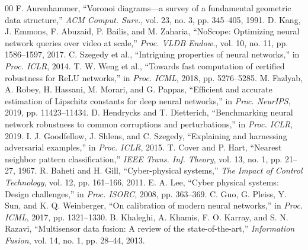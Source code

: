 \documentclass[conference]{IEEEtran}
\begin{document}
\begin{thebibliography}{00}
 F. Aurenhammer, ``Voronoi diagrams---a survey of a fundamental geometric data structure,'' \emph{ACM Comput. Surv.}, vol. 23, no. 3, pp. 345--405, 1991.
 D. Kang, J. Emmons, F. Abuzaid, P. Bailis, and M. Zaharia, ``NoScope: Optimizing neural network queries over video at scale,'' \emph{Proc. VLDB Endow.}, vol. 10, no. 11, pp. 1586--1597, 2017.
 C. Szegedy et al., ``Intriguing properties of neural networks,'' in \emph{Proc. ICLR}, 2014.
 T. W. Weng et al., ``Towards fast computation of certified robustness for ReLU networks,'' in \emph{Proc. ICML}, 2018, pp. 5276--5285.
 M. Fazlyab, A. Robey, H. Hassani, M. Morari, and G. Pappas, ``Efficient and accurate estimation of Lipschitz constants for deep neural networks,'' in \emph{Proc. NeurIPS}, 2019, pp. 11423--11434.
 D. Hendrycks and T. Dietterich, ``Benchmarking neural network robustness to common corruptions and perturbations,'' in \emph{Proc. ICLR}, 2019.
 I. J. Goodfellow, J. Shlens, and C. Szegedy, ``Explaining and harnessing adversarial examples,'' in \emph{Proc. ICLR}, 2015.
 T. Cover and P. Hart, ``Nearest neighbor pattern classification,'' \emph{IEEE Trans. Inf. Theory}, vol. 13, no. 1, pp. 21--27, 1967.
 R. Baheti and H. Gill, ``Cyber-physical systems,'' \emph{The Impact of Control Technology}, vol. 12, pp. 161--166, 2011.
 E. A. Lee, ``Cyber physical systems: Design challenges,'' in \emph{Proc. ISORC}, 2008, pp. 363--369.
 C. Guo, G. Pleiss, Y. Sun, and K. Q. Weinberger, ``On calibration of modern neural networks,'' in \emph{Proc. ICML}, 2017, pp. 1321--1330.
 B. Khaleghi, A. Khamis, F. O. Karray, and S. N. Razavi, ``Multisensor data fusion: A review of the state-of-the-art,'' \emph{Information Fusion}, vol. 14, no. 1, pp. 28--44, 2013.
\end{thebibliography}
\end{document}
